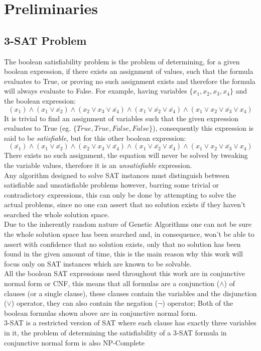 \section{Preliminaries}
\label{section:preliminaries}

\subsection{3-SAT Problem}
\label{subsection:3sat}

The boolean satisfiability problem is the problem of determining, for a given boolean expression, if there exists an assignment of values, such that the formula evaluates to True, or proving no such assignment exists and therefore the formula will always evaluate to False. For example, having variables $\{x_1, x_2, x_3, x_4\}$ and the boolean expression:
\begin{equation*}
 (x_1) \land (x_1 \lor \overline{x_2}) \land (x_2 \lor x_3 \lor \overline{x_4}) \land (x_1 \lor \overline{x_2} \lor \overline{x_4}) \land (x_1 \lor x_2 \lor \overline{x_3} \lor x_4)
\end{equation*}
It is trivial to find an assignment of variables such that the given expression evaluates to True (eg. $\{True, True, False, False\}$), consequently this expression is said to be \textit{satisfiable}, but for this other boolean expression:
\begin{equation*}
 (\overline{x_1}) \land (x_1 \lor \overline{x_2}) \land (x_2 \lor x_3 \lor \overline{x_4}) \land (x_1 \lor \overline{x_2} \lor \overline{x_4}) \land (x_1 \lor x_2 \lor \overline{x_3} \lor x_4)
\end{equation*} 
There exists no such assignment, the equation will never be solved by tweaking the variable values, therefore it is an \textit{unsatisfiable} expression.
\\Any algorithm designed to solve SAT instances must distinguish between satisfiable and unsatisfiable problems however, barring some trivial or contradictory expressions, this can only be done by attempting to solve the actual problems, since no one can assert that no solution exists if they haven't searched the whole solution space.
\\Due to the inherently random nature of Genetic Algorithms one can not be sure the whole solution space has been searched and, in consequence, won't be able to assert with confidence that no solution exists, only that no solution has been found in the given amount of time, this is the main reason why this work will focus only on SAT instances which are known to be solvable.
\\All the boolean SAT expressions used throughout this work are in conjunctive normal form or CNF, this means that all formulas are a conjunction ($\wedge$) of clauses (or a single clause), these clauses contain the variables and the disjunction ($\vee$) operator, they can also contain the negation ($\neg$) operator; Both of the boolean formulas shown above are in conjunctive normal form.
\\3-SAT is a restricted version of SAT where each clause has exactly three variables in it, the problem of determining the satisfiability of a 3-SAT formula in conjunctive normal form is also NP-Complete \parencite{Karp2010} 

